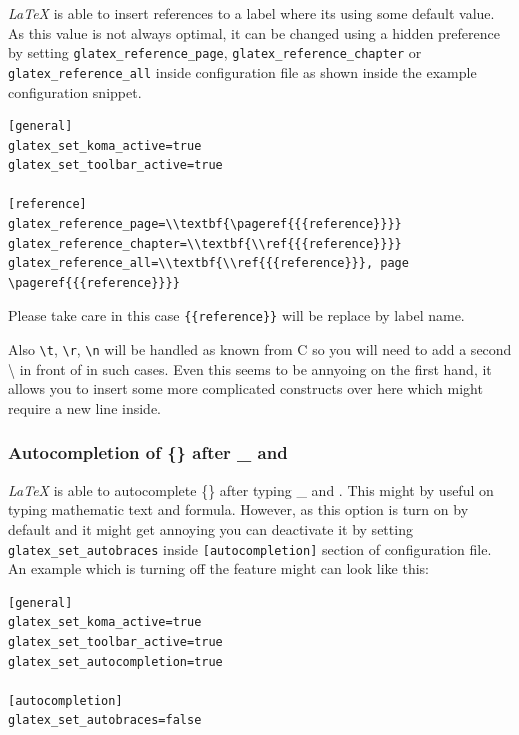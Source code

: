 \documentclass[%
paper=a4,%
fontsize=11pt,%
twoside=false,%
DIV18,%
headsepline,%
plainheadsepline,%
footsepline,%
plainfootsepline,%
bibliography=totoc,%
listof=totoc,%
BCOR10mm,%
parskip=half,%
openany,%
]{scrreprt}
\begin{document}
\textit{LaTeX} is able to insert references to a label where its
using some default value. As this value is not always optimal, it
can be changed using a hidden preference by setting
\texttt{glatex\_reference\_page}, \texttt{glatex\_reference\_chapter} or
\texttt{glatex\_reference\_all} inside configuration file as shown inside
the example configuration snippet.

\begin{lstlisting}[caption={Configuration example for customized reference strings}]
[general]
glatex_set_koma_active=true
glatex_set_toolbar_active=true

[reference]
glatex_reference_page=\\textbf{\pageref{{{reference}}}}
glatex_reference_chapter=\\textbf{\\ref{{{reference}}}}
glatex_reference_all=\\textbf{\\ref{{{reference}}}, page \pageref{{{reference}}}}
\end{lstlisting}

Please take care in this case \texttt{\{\{reference\}\}} will be
replace by label name.

Also \texttt{\textbackslash{}t}, \texttt{\textbackslash{}r},
\texttt{\textbackslash{}n} will be handled as known from C so you will
need to add a second \textbackslash{} in front of in such cases. Even
this seems to be annyoing on the first hand, it allows you to insert some
more complicated constructs over  here which might require a new line inside.


\subsubsection{Autocompletion of \{\} after \_ and }
\label{sec:autoadding_of_braces}
\textit{LaTeX} is able to autocomplete \{\} after typing \_ and
. This might by useful on typing mathematic text and
formula. However, as this option is turn on by default and it might
get annoying you can deactivate it by setting \texttt{glatex\_set\_autobraces}
inside \texttt{[autocompletion]} section of configuration file. An example
which is turning off the feature might can look like this:

\begin{lstlisting}[caption={Configuration example for autocompletion of %
                            \{\} after \_ and \symbol{94}}]
[general]
glatex_set_koma_active=true
glatex_set_toolbar_active=true
glatex_set_autocompletion=true

[autocompletion]
glatex_set_autobraces=false
\end{lstlisting}
\end{document}
